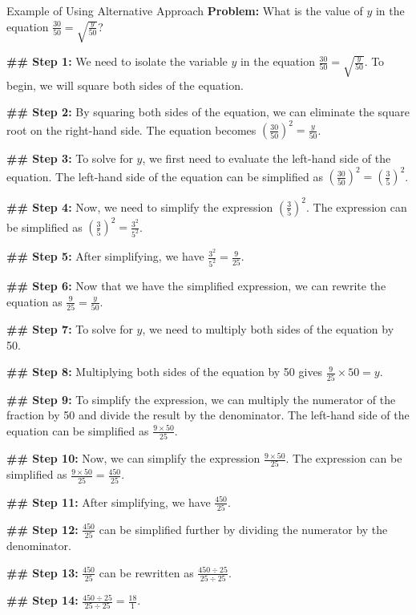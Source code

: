 \begin{promptbox}{Example of Using Alternative Approach}
\textbf{Problem:} What is the value of $y$ in the equation $\frac{30}{50}=\sqrt{\frac{y}{50}}$?

\textbf{ \#\# Step 1:} We need to isolate the variable $y$ in the equation $\frac{30}{50}=\sqrt{\frac{y}{50}}$. To begin, we will square both sides of the equation.

\textbf{ \#\# Step 2:} By squaring both sides of the equation, we can eliminate the square root on the right-hand side. The equation becomes $\left(\frac{30}{50}\right)^2=\frac{y}{50}$.

\textbf{ \#\# Step 3:} To solve for $y$, we first need to evaluate the left-hand side of the equation. The left-hand side of the equation can be simplified as $\left(\frac{30}{50}\right)^2=\left(\frac{3}{5}\right)^2$.

\textbf{ \#\# Step 4:} Now, we need to simplify the expression $\left(\frac{3}{5}\right)^2$. The expression can be simplified as $\left(\frac{3}{5}\right)^2=\frac{3^2}{5^2}$.

\textbf{ \#\# Step 5:} After simplifying, we have $\frac{3^2}{5^2}=\frac{9}{25}$.

\textbf{ \#\# Step 6:} Now that we have the simplified expression, we can rewrite the equation as $\frac{9}{25}=\frac{y}{50}$.

\textbf{ \#\# Step 7:} To solve for $y$, we need to multiply both sides of the equation by 50.

\textbf{ \#\# Step 8:} Multiplying both sides of the equation by 50 gives $\frac{9}{25} \times 50=y$.

\textbf{ \#\# Step 9:} To simplify the expression, we can multiply the numerator of the fraction by 50 and divide the result by the denominator. The left-hand side of the equation can be simplified as $\frac{9 \times 50}{25}$.

\textbf{ \#\# Step 10:} Now, we can simplify the expression $\frac{9 \times 50}{25}$. The expression can be simplified as $\frac{9 \times 50}{25}=\frac{450}{25}$.

\textbf{ \#\# Step 11:} After simplifying, we have $\frac{450}{25}$.

\textbf{ \#\# Step 12:} $\frac{450}{25}$ can be simplified further by dividing the numerator by the denominator.

\textbf{ \#\# Step 13:} $\frac{450}{25}$ can be rewritten as $\frac{450\div25}{25\div25}$.

\textbf{ \#\# Step 14:} $\frac{450\div25}{25\div25}=\frac{18}{1}$.


\end{promptbox}
